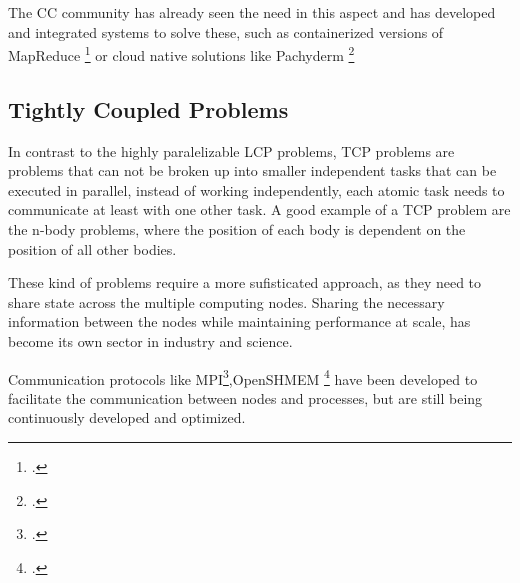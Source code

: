 The \ac{CC} community has already seen the need in this aspect and has developed and integrated systems to solve these,
such as containerized versions of MapReduce \footcite{camacho-rodriguezApacheHiveMapReduce2019} or cloud native solutions like Pachyderm \footcite{HomePage2022}


\subsection{Tightly Coupled Problems}
\label{state_of_the_art_tcp}
In contrast to the highly paralelizable  \ac{LCP} problems, \ac{TCP} problems are problems that can not be broken up into smaller independent tasks that can be executed in parallel,
instead of working independently, each atomic task needs to communicate at least with one other task.
A good example of a \ac{TCP} problem are the n-body problems, where the position of each body is dependent on the position of all other bodies.

These kind of problems require a more sufisticated approach, as they need to share state across the multiple computing nodes.
Sharing the necessary information between the nodes while maintaining performance at scale, has become its own sector in industry and science.

Communication protocols like \ac{MPI}\footcite{snirMPICompleteReference1998},\break \ac{OpenSHMEM} \footcite{chapmanIntroducingOpenSHMEMSHMEM2010}
have been developed to facilitate the communication between nodes and processes, but are still being continuously developed and optimized.